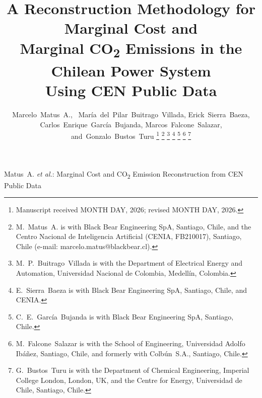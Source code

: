 \documentclass[journal]{IEEEtran}
\begin{document}
\title{%
  A Reconstruction Methodology for Marginal Cost and\\
  Marginal CO\textsubscript{2} Emissions in the Chilean Power System\\
  Using CEN Public Data%
}

\author{%
  Marcelo~Matus~A.,~
  Mar\'ia~del~Pilar~Buitrago~Villada,
  Erick~Sierra~Baeza,
  Carlos~Enrique~Garc\'ia~Bujanda,
  Marcos~Falcone~Salazar,
  and~Gonzalo~Bustos~Turu%
  \thanks{Manuscript received MONTH DAY, 2026; revised MONTH DAY, 2026.}%
  \thanks{M.~Matus~A. is with Black Bear Engineering SpA, Santiago,
    Chile, and the Centro Nacional de Inteligencia Artificial
    (CENIA, FB210017), Santiago, Chile
    (e-mail: marcelo.matus@blackbear.cl).}%
  \thanks{M.~P.~Buitrago~Villada is with the Department of Electrical
    Energy and Automation, Universidad Nacional de Colombia,
    Medell\'in, Colombia.}%
  \thanks{E.~Sierra~Baeza is with Black Bear Engineering SpA, Santiago,
    Chile, and CENIA.}%
  \thanks{C.~E.~Garc\'ia~Bujanda is with Black Bear Engineering SpA,
    Santiago, Chile.}%
  \thanks{M.~Falcone~Salazar is with the School of Engineering,
    Universidad Adolfo Ib\'a\~nez, Santiago, Chile, and formerly with
    Colb\'un~S.A., Santiago, Chile.}%
  \thanks{G.~Bustos~Turu is with the Department of Chemical Engineering,
    Imperial College London, London, UK, and the Centre for Energy,
    Universidad de Chile, Santiago, Chile.}%
}

%
  {Matus~A. \MakeLowercase{\textit{et al.}}: Marginal Cost and CO\textsubscript{2} Emission Reconstruction from CEN Public Data}

\maketitle













\end{document}
